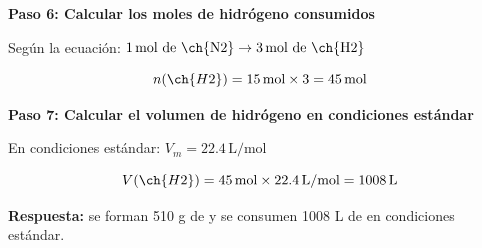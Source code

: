\begin{exercise}
\begin{solu}
        \textbf{Paso 6: Calcular los moles de hidrógeno consumidos}

        Según la ecuación: $1\,\text{mol de \ch{N2}} \rightarrow 3\,\text{mol de \ch{H2}}$

        \begin{equation*}
            n(\ch{H2}) = 15\,\text{mol} \times 3 = 45\,\text{mol}
        \end{equation*}

        \textbf{Paso 7: Calcular el volumen de hidrógeno en condiciones estándar}

        En condiciones estándar: $V_m = 22.4\,\text{L/mol}$

        \begin{equation*}
            V(\ch{H2}) = 45\,\text{mol} \times 22.4\,\text{L/mol} = 1008\,\text{L}
        \end{equation*}

        \textbf{Respuesta:} se forman 510 g de  y se consumen 1008 L de  en condiciones estándar.
    \end{solu}
\end{exercise}

